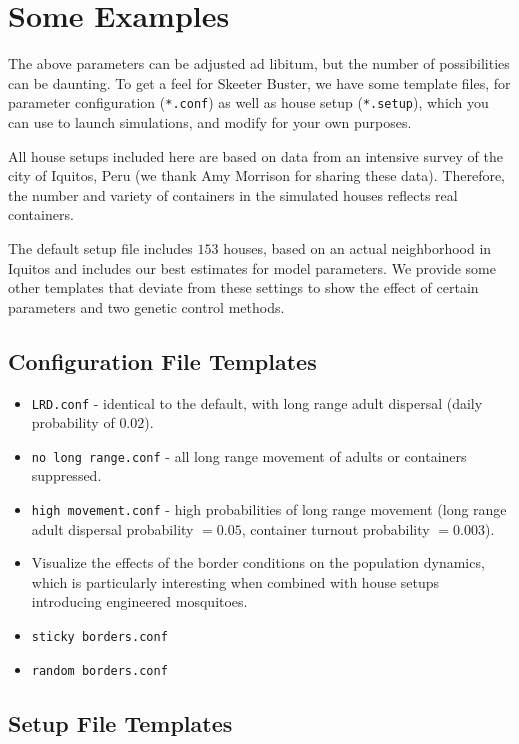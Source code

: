 \documentclass[11pt]{article}
\newcommand{\linecmd}[1]{\texttt{#1}}
\begin{document}
\section{Some Examples}

The above parameters can be adjusted ad libitum, but the number of possibilities can be daunting. To get a feel for Skeeter Buster, we have some template files, for parameter configuration (\linecmd{*.conf}) as well as house setup (\linecmd{*.setup}), which you can use to launch simulations, and modify for your own purposes.

All house setups included here are based on data from an intensive survey of the city of Iquitos, Peru (we thank Amy Morrison for sharing these data). Therefore, the number and variety of containers in the simulated houses reflects real containers.

The default setup file includes $153$ houses, based on an actual neighborhood in Iquitos and includes our best estimates for model parameters. We provide some other templates that deviate from these settings to show the effect of certain parameters and two genetic control methods.

\subsection{Configuration File Templates}
\begin{itemize}
	\item \linecmd{LRD.conf} - identical to the default, with long range adult dispersal (daily probability of $0.02$).
	\item \linecmd{no long range.conf} - all long range movement of adults or containers suppressed.
	\item \linecmd{high movement.conf} - high probabilities of long range movement (long range adult dispersal probability $=0.05$, container turnout probability $=0.003$).
	\item[] Visualize the effects of the border conditions on the population dynamics, which is particularly interesting when combined with house setups introducing engineered mosquitoes.
	\item \linecmd{sticky borders.conf}
	\item \linecmd{random borders.conf}
\end{itemize}

\subsection{Setup File Templates}
\end{document}
